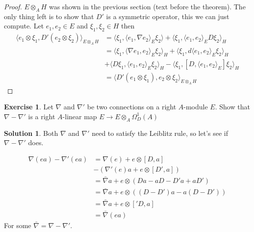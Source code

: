 \documentclass[a4paper]{article}
\theoremstyle{definition}
\theoremstyle{definition}
\theoremstyle{definition}
\theoremstyle{theorem}
\theoremstyle{theorem}
\theoremstyle{theorem}
\newtheorem{exercise}{Exercise}
\theoremstyle{definition}
\newtheorem{solution}{Solution}
\begin{document}
\begin{proof}
    $E\otimes _A H$ was shown in the previous section (text before the
    theorem). The only thing left is to show that $D'$ is a symmetric
    operator, this we can just compute. Let $e_1, e_2 \in E$ and $\xi _1,
    \xi _2 \in H$ then
    \begin{align*}
        \langle e_1 \otimes \xi _1, D'(e_2 \otimes \xi_2)\rangle _{E\otimes _A H} &=
        \langle \xi _1, \langle e_1, \nabla e_2\rangle _E  \xi _2\rangle  + \langle \xi _1 , \langle e_1, e_2\rangle _E D\xi
        _2\rangle _H \\
        &= \langle \xi _1, \langle \nabla e_1, e_2\rangle _E \xi _2\rangle _H + \langle \xi _1, d\langle e_1, e_2\rangle  _E
        \xi _2\rangle _H \\
        &+ \langle D\xi _1,\langle e_1, e_2\rangle _E \xi _2\rangle _H - \langle \xi _1, [D, \langle e_1, e_2\rangle _E] \xi
        _2 \rangle _H \\
        &= \langle D'(e_1 \otimes \xi _1), e_2 \otimes \xi _2\rangle _{E \otimes _A H}
    \end{align*}
\end{proof}

\begin{exercise}
    Let $\nabla$ and $\nabla'$ be two connections on a right $A$-module
    $E$. Show that $\nabla - \nabla'$ is a right $A$-linear map
    $E \rightarrow E\otimes _A \Omega _D^1(A)$
\end{exercise}
\begin{solution}
    Both $\nabla$ and $\nabla'$ need to satisfy the Leiblitz rule, so
    let's see if $\nabla - \nabla'$ does.

    \begin{align*}
        \nabla(ea)-\nabla'(ea)&=\nabla(e) + e\otimes[D, a]\\
        &-(\nabla'(e)a + e\otimes[D',a])\\
        &=\bar{\nabla}a + e\otimes(Da-aD-D'a+aD')\\
        &=\bar{\nabla}a + e\otimes((D-D')a-a(D-D'))\\
        &=\bar{\nabla}a + e\otimes[\prime{D}, a]\\
        &=\bar{\nabla}(ea)
    \end{align*}
    For some $\bar{\nabla}=\nabla-\nabla'$.
\end{solution}
\end{document}
